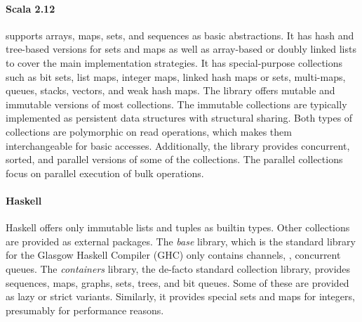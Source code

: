 \documentclass[sigconf, authorversion]{acmart}
\begin{document}
\paragraph{Scala 2.12}
\label{sec:scala-col}

supports arrays, maps, sets, and sequences as basic abstractions.
It has hash and tree-based versions for sets and maps
as well as array-based or doubly linked lists
to cover the main implementation strategies.
It has special-purpose collections
such as bit sets, list maps, integer maps, linked hash maps or sets, multi-maps,
queues, stacks, vectors, and weak hash maps.
The library offers mutable and immutable versions
of most collections.
The immutable collections are typically implemented
as persistent data structures with structural sharing.
Both types of collections are polymorphic on read operations,
which makes them interchangeable for basic accesses.
Additionally, the library provides concurrent, sorted,
and parallel versions of some of the collections.
The parallel collections focus on parallel execution of bulk operations.

%

\paragraph{Haskell}


Haskell offers only immutable lists and tuples as builtin types.
Other collections are provided as external packages.
The \emph{base} library,
which is the standard library for the Glasgow Haskell Compiler (GHC)
only contains channels, \ie, concurrent queues.
The \emph{containers} library, the de-facto standard collection library,
provides sequences, maps, graphs, sets, trees, and bit queues.
Some of these are provided as lazy or strict variants.
Similarly, it provides special sets and maps for integers,
presumably for performance reasons.
\end{document}

